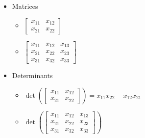 \documentclass[11pt]{article}
\theoremstyle{plain}
\theoremstyle{definition}
\theoremstyle{remark}
\newcommand{\<}{\langle}
\renewcommand{\>}{\rangle}
\begin{document}
\begin{itemize}
  \item Matrices
    \begin{itemize}
      \item
        \(
          \begin{bmatrix}
            x_{11} & x_{12} \\
            x_{21} & x_{22}
          \end{bmatrix}
        \)
      \item
        \(
          \begin{bmatrix}
            x_{11} & x_{12} & x_{13} \\
            x_{21} & x_{22} & x_{23} \\
            x_{31} & x_{32} & x_{33}
          \end{bmatrix}
        \)
    \end{itemize}
  \item Determinants
    \begin{itemize}
      \item
        \(
          \det\left(\begin{bmatrix}
            x_{11} & x_{12} \\
            x_{21} & x_{22}
          \end{bmatrix}\right)
            =
          x_{11}x_{22} - x_{12}x_{21}
        \)
      \item
        \(
          \det\left(\begin{bmatrix}
            x_{11} & x_{12} & x_{13} \\
            x_{21} & x_{22} & x_{23} \\
            x_{31} & x_{32} & x_{33}
          \end{bmatrix}\right)
        \)


\end{itemize}
\end{itemize}
\end{document}
